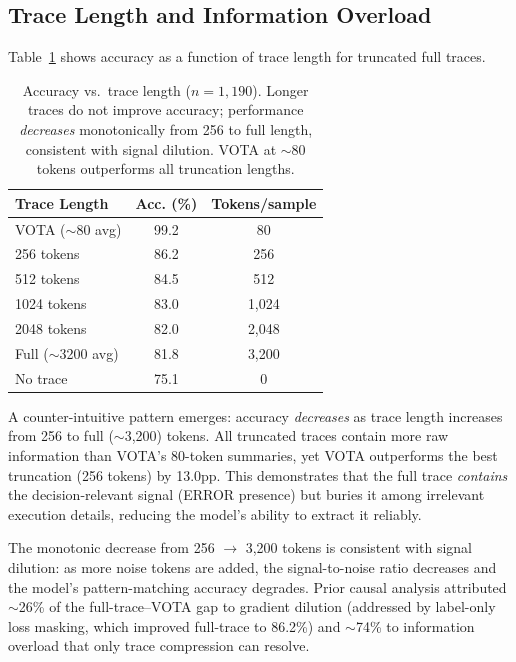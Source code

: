 \documentclass[11pt,a4paper]{article}
\begin{document}
\subsection{Trace Length and Information Overload}
\label{sec:overload}

Table~\ref{tab:length} shows accuracy as a function of trace length for truncated full traces.

\begin{table}[t]
\centering
\small
\begin{tabular}{lcc}
\toprule
\textbf{Trace Length} & \textbf{Acc. (\%)} & \textbf{Tokens/sample} \\
\midrule
VOTA ($\sim$80 avg) & 99.2 & 80 \\
256 tokens & 86.2 & 256 \\
512 tokens & 84.5 & 512 \\
1024 tokens & 83.0 & 1,024 \\
2048 tokens & 82.0 & 2,048 \\
Full ($\sim$3200 avg) & 81.8 & 3,200 \\
No trace & 75.1 & 0 \\
\bottomrule
\end{tabular}
\caption{Accuracy vs.\ trace length ($n=1{,}190$). Longer traces do not improve accuracy; performance \emph{decreases} monotonically from 256 to full length, consistent with signal dilution. VOTA at $\sim$80 tokens outperforms all truncation lengths.}
\label{tab:length}
\end{table}

A counter-intuitive pattern emerges: accuracy \emph{decreases} as trace length increases from 256 to full ($\sim$3,200) tokens.
All truncated traces contain more raw information than VOTA's 80-token summaries, yet VOTA outperforms the best truncation (256 tokens) by 13.0pp.
This demonstrates that the full trace \emph{contains} the decision-relevant signal (ERROR presence) but buries it among irrelevant execution details, reducing the model's ability to extract it reliably.

The monotonic decrease from 256 $\to$ 3,200 tokens is consistent with signal dilution: as more noise tokens are added, the signal-to-noise ratio decreases and the model's pattern-matching accuracy degrades.
Prior causal analysis attributed $\sim$26\% of the full-trace--VOTA gap to gradient dilution (addressed by label-only loss masking, which improved full-trace to 86.2\%) and $\sim$74\% to information overload that only trace compression can resolve.
\end{document}
